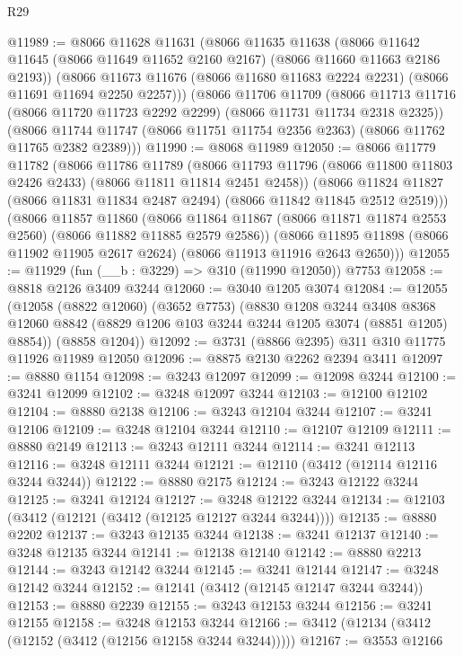 \begin{lexlean}{R29}
\begin{coremodule}
@11989 := @8066
    @11628
    @11631
    (@8066
      @11635
      @11638
      (@8066 @11642 @11645 (@8066 @11649 @11652 @2160 @2167) (@8066 @11660 @11663 @2186 @2193))
      (@8066 @11673 @11676 (@8066 @11680 @11683 @2224 @2231) (@8066 @11691 @11694 @2250 @2257)))
    (@8066
      @11706
      @11709
      (@8066 @11713 @11716 (@8066 @11720 @11723 @2292 @2299) (@8066 @11731 @11734 @2318 @2325))
      (@8066 @11744 @11747 (@8066 @11751 @11754 @2356 @2363) (@8066 @11762 @11765 @2382 @2389)))
@11990 := @8068 @11989
@12050 := @8066
    @11779
    @11782
    (@8066
      @11786
      @11789
      (@8066 @11793 @11796 (@8066 @11800 @11803 @2426 @2433) (@8066 @11811 @11814 @2451 @2458))
      (@8066 @11824 @11827 (@8066 @11831 @11834 @2487 @2494) (@8066 @11842 @11845 @2512 @2519)))
    (@8066
      @11857
      @11860
      (@8066 @11864 @11867 (@8066 @11871 @11874 @2553 @2560) (@8066 @11882 @11885 @2579 @2586))
      (@8066 @11895 @11898 (@8066 @11902 @11905 @2617 @2624) (@8066 @11913 @11916 @2643 @2650)))
@12055 := @11929 (fun (__b : @3229) => @310 (@11990 @12050)) @7753
@12058 := @8818 @2126 @3409 @3244
@12060 := @3040 @1205 @3074
@12084 := @12055
    (@12058
      (@8822 @12060)
      (@3652 @7753)
      (@8830
        @1208
        @3244
        @3408
        @8368
        @12060
        @8842
        (@8829 @1206 @103 @3244 @3244 @1205 @3074 (@8851 @1205) @8854))
      (@8858 @1204))
@12092 := @3731 (@8866 @2395) @311 @310 @11775 @11926 @11989 @12050
@12096 := @8875 @2130 @2262 @2394 @3411
@12097 := @8880 @1154
@12098 := @3243 @12097
@12099 := @12098 @3244
@12100 := @3241 @12099
@12102 := @3248 @12097 @3244
@12103 := @12100 @12102
@12104 := @8880 @2138
@12106 := @3243 @12104 @3244
@12107 := @3241 @12106
@12109 := @3248 @12104 @3244
@12110 := @12107 @12109
@12111 := @8880 @2149
@12113 := @3243 @12111 @3244
@12114 := @3241 @12113
@12116 := @3248 @12111 @3244
@12121 := @12110 (@3412 (@12114 @12116 @3244 @3244))
@12122 := @8880 @2175
@12124 := @3243 @12122 @3244
@12125 := @3241 @12124
@12127 := @3248 @12122 @3244
@12134 := @12103 (@3412 (@12121 (@3412 (@12125 @12127 @3244 @3244))))
@12135 := @8880 @2202
@12137 := @3243 @12135 @3244
@12138 := @3241 @12137
@12140 := @3248 @12135 @3244
@12141 := @12138 @12140
@12142 := @8880 @2213
@12144 := @3243 @12142 @3244
@12145 := @3241 @12144
@12147 := @3248 @12142 @3244
@12152 := @12141 (@3412 (@12145 @12147 @3244 @3244))
@12153 := @8880 @2239
@12155 := @3243 @12153 @3244
@12156 := @3241 @12155
@12158 := @3248 @12153 @3244
@12166 := @3412 (@12134 (@3412 (@12152 (@3412 (@12156 @12158 @3244 @3244)))))
@12167 := @3553 @12166

\end{coremodule}
\end{lexlean}
